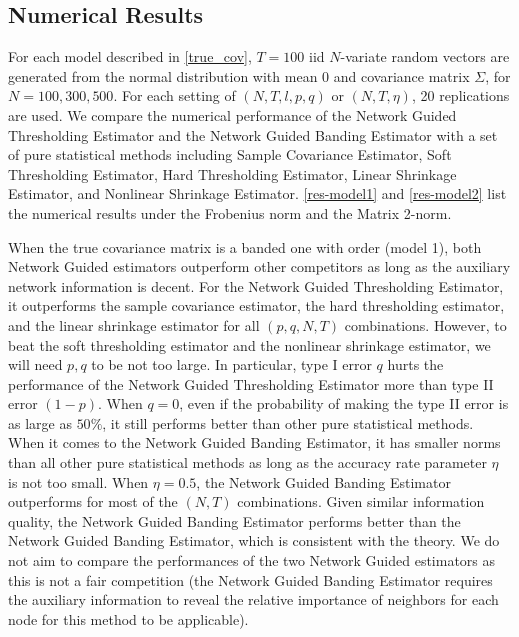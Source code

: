 \subsection{Numerical Results}
For each model described in \autoref{true_cov}, $T=100$ iid $N$-variate random vectors are generated from the normal distribution with mean 0 and covariance matrix $\Sigma$, for $N = 100, 300, 500$. For each setting of $(N, T, l, p, q)$ or $(N, T, \eta)$, 20 replications are used. We compare the numerical performance of the Network Guided Thresholding Estimator and the Network Guided Banding Estimator with a set of pure statistical methods including Sample Covariance Estimator, Soft Thresholding Estimator, Hard Thresholding Estimator, Linear Shrinkage Estimator, and Nonlinear Shrinkage Estimator. \autoref{res-model1} and \autoref{res-model2} list the numerical results under the Frobenius norm and the Matrix 2-norm. 

When the true covariance matrix is a banded one with order (model 1), both Network Guided estimators outperform other competitors as long as the auxiliary network information is decent. For the Network Guided Thresholding Estimator, it outperforms the sample covariance estimator, the hard thresholding estimator, and the linear shrinkage estimator for all $(p,q, N,T)$ combinations. However, to beat the soft thresholding estimator and the nonlinear shrinkage estimator, we will need $p,q$ to be not too large. In particular, type I error $q$ hurts the performance of the Network Guided Thresholding Estimator more than type II error $(1-p)$. When $q=0$, even if the probability of making the type II error is as large as $50\%$, it still performs better than other pure statistical methods. When it comes to the Network Guided Banding Estimator, it has smaller norms than all other pure statistical methods as long as the accuracy rate parameter $\eta$ is not too small. When $\eta=0.5$, the Network Guided Banding Estimator outperforms for most of the $(N,T)$ combinations. Given similar information quality, the Network Guided Banding Estimator performs better than the Network Guided Banding Estimator, which is consistent with the theory. We do not aim to compare the performances of the two Network Guided estimators as this is not a fair competition (the Network Guided Banding Estimator requires the auxiliary information to reveal the relative importance of neighbors for each node for this method to be applicable).

